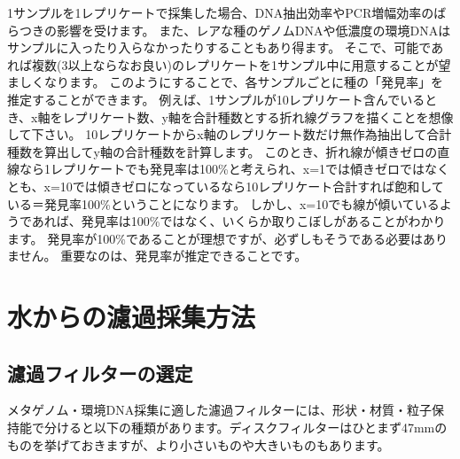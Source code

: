 \documentclass[titlepage,10pt,a4paper,uplatex]{jsbook}
\begin{document}
1サンプルを1レプリケートで採集した場合、DNA抽出効率やPCR増幅効率のばらつきの影響を受けます。
また、レアな種のゲノムDNAや低濃度の環境DNAはサンプルに入ったり入らなかったりすることもあり得ます。
そこで、可能であれば複数(3以上ならなお良い)のレプリケートを1サンプル中に用意することが望ましくなります。
このようにすることで、各サンプルごとに種の「発見率」を推定することができます。
例えば、1サンプルが10レプリケート含んでいるとき、x軸をレプリケート数、y軸を合計種数とする折れ線グラフを描くことを想像して下さい。
10レプリケートからx軸のレプリケート数だけ無作為抽出して合計種数を算出してy軸の合計種数を計算します。
このとき、折れ線が傾きゼロの直線なら1レプリケートでも発見率は100\%と考えられ、x=1では傾きゼロではなくとも、x=10では傾きゼロになっているなら10レプリケート合計すれば飽和している＝発見率100\%ということになります。
しかし、x=10でも線が傾いているようであれば、発見率は100\%ではなく、いくらか取りこぼしがあることがわかります。
発見率が100\%であることが理想ですが、必ずしもそうである必要はありません。
重要なのは、発見率が推定できることです。

\section{水からの濾過採集方法}

\subsection{濾過フィルターの選定}

メタゲノム・環境DNA採集に適した濾過フィルターには、形状・材質・粒子保持能で分けると以下の種類があります。ディスクフィルターはひとまず47mmのものを挙げておきますが、より小さいものや大きいものもあります。
\end{document}
